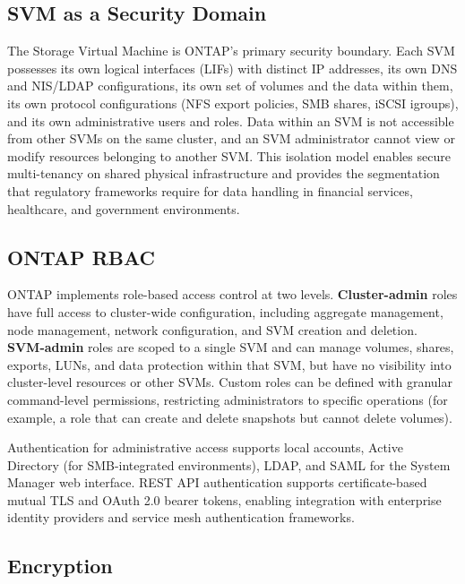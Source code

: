 \begin{securitybox}

\subsection*{SVM as a Security Domain}

The Storage Virtual Machine is ONTAP's primary security boundary. Each SVM possesses its own logical interfaces (LIFs) with distinct IP addresses, its own DNS and NIS/LDAP configurations, its own set of volumes and the data within them, its own protocol configurations (NFS export policies, SMB shares, iSCSI igroups), and its own administrative users and roles. Data within an SVM is not accessible from other SVMs on the same cluster, and an SVM administrator cannot view or modify resources belonging to another SVM. This isolation model enables secure multi-tenancy on shared physical infrastructure and provides the segmentation that regulatory frameworks require for data handling in financial services, healthcare, and government environments.

\subsection*{ONTAP RBAC}

ONTAP implements role-based access control at two levels. \textbf{Cluster-admin} roles have full access to cluster-wide configuration, including aggregate management, node management, network configuration, and SVM creation and deletion. \textbf{SVM-admin} roles are scoped to a single SVM and can manage volumes, shares, exports, LUNs, and data protection within that SVM, but have no visibility into cluster-level resources or other SVMs. Custom roles can be defined with granular command-level permissions, restricting administrators to specific operations (for example, a role that can create and delete snapshots but cannot delete volumes).

Authentication for administrative access supports local accounts, Active Directory (for SMB-integrated environments), LDAP, and SAML for the System Manager web interface. REST API authentication supports certificate-based mutual TLS and OAuth 2.0 bearer tokens, enabling integration with enterprise identity providers and service mesh authentication frameworks.

\subsection*{Encryption}


\end{securitybox}
